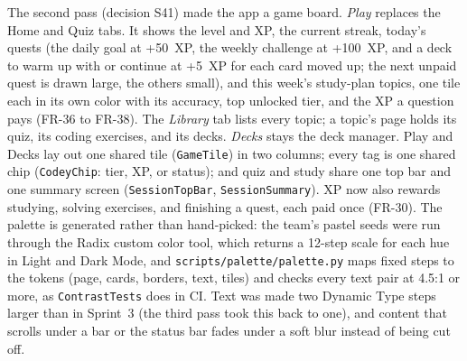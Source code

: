 \documentclass[12pt,letterpaper]{article}
\begin{document}
The second pass (decision S41) made the app a game board. \emph{Play} replaces the
Home and Quiz tabs. It shows the level and XP, the current streak, today's quests (the
daily goal at +50~XP, the weekly challenge at +100~XP, and a deck to warm up with or
continue at +5~XP for each card moved up; the next unpaid quest is drawn large, the
others small), and this week's study-plan topics, one tile each in its own color with
its accuracy, top unlocked tier, and the XP a question pays (FR-36 to FR-38). The
\emph{Library} tab lists every topic; a topic's page holds its quiz, its coding
exercises, and its decks. \emph{Decks} stays the deck manager. Play and Decks lay out one shared tile
(\texttt{GameTile}) in two columns; every tag is one shared chip (\texttt{CodeyChip}:
tier, XP, or status); and quiz and study share one top bar and one summary screen
(\texttt{SessionTopBar}, \texttt{SessionSummary}). XP now also rewards studying,
solving exercises, and finishing a quest, each paid once (FR-30). The palette is
generated rather than hand-picked: the team's pastel seeds were run through the Radix
custom color tool, which returns a 12-step scale for each hue in Light and Dark Mode,
and \texttt{scripts/palette/palette.py} maps fixed steps to the tokens (page, cards,
borders, text, tiles) and checks every text pair at 4.5:1 or more, as
\texttt{ContrastTests} does in CI. Text was made two Dynamic Type steps larger than in
Sprint~3 (the third pass took this back to one), and content that scrolls under a bar or the status bar fades under a soft
blur instead of being cut off.
\end{document}
